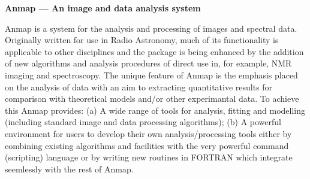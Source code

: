 

\begin{center}
{\large\bf Anmap --- An image and data analysis system}
\end{center}

Anmap is a system for the analysis and processing of images
and spectral data.  Originally written for use in Radio Astronomy,
much of its functionality is applicable to other disciplines and
the package is being enhanced by the addition of new algorithms
and analysis procedures of direct use in, for example, NMR
imaging and spectroscopy.  The unique feature of Anmap is the
emphasis placed on the analysis of data with an aim to extracting
quantitative results for comparison with theoretical models
and/or other experimantal data.  To achieve this Anmap provides:
(a) A wide range of tools for analysis, fitting and modelling
(including standard image and data processing algorithms);
(b) A powerful environment for users to develop their own
analysis/processing tools either by combining existing 
algorithms and facilities with the very powerful command
(scripting) language or by writing new routines in FORTRAN
which integrate seemlessly with the rest of Anmap.  

